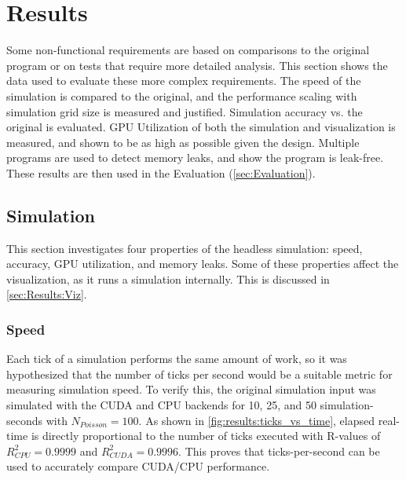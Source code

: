 
\newcommand{\npoisson}{N_{Poisson}}

\chapter{Results}\label{sec:Results}
Some non-functional requirements are based on comparisons to the original program or on tests that require more detailed analysis.
This section shows the data used to evaluate these more complex requirements.
The speed of the simulation is compared to the original, and the performance scaling with simulation grid size is measured and justified.
Simulation accuracy vs. the original is evaluated.
GPU Utilization of both the simulation and visualization is measured, and shown to be as high as possible given the design.
Multiple programs are used to detect memory leaks, and show the program is leak-free.
These results are then used in the Evaluation (\cref{sec:Evaluation}).

\pagebreak
\section{Simulation}
This section investigates four properties of the headless simulation: speed, accuracy, GPU utilization, and memory leaks.
Some of these properties affect the visualization, as it runs a simulation internally.
This is discussed in \cref{sec:Results:Viz}.

\subsection{Speed}\label{sec:Results:Sim:Speed}



Each tick of a simulation performs the same amount of work, so it was hypothesized that the number of ticks per second would be a suitable metric for measuring simulation speed.
To verify this, the original simulation input was simulated with the CUDA and CPU backends for 10, 25, and 50 simulation-seconds with $\npoisson = 100$.
As shown in \cref{fig:results:ticks_vs_time}, elapsed real-time is directly proportional to the number of ticks executed with R-values of $R^2_{CPU} = 0.9999$ and $R^2_{CUDA} = 0.9996$.
This proves that ticks-per-second can be used to accurately compare CUDA/CPU performance.

